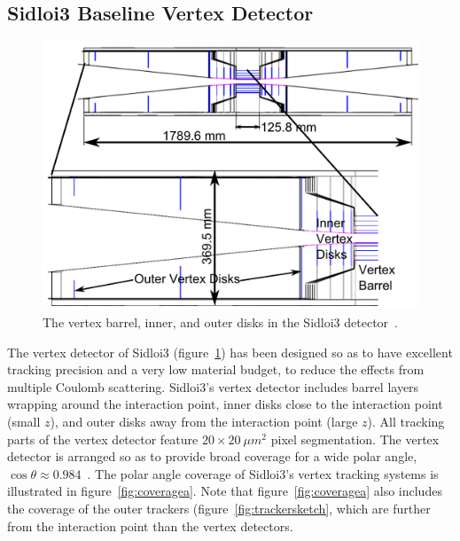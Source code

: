 \subsection{Sidloi3 Baseline Vertex Detector}
\begin{figure}[t]
\centering
\includegraphics{vertexDetectorSketch1.png}
\caption{The vertex barrel, inner, and outer disks
in the Sidloi3 detector~\cite{Behnke:2013lya}.}
\label{fig:vertexsketch}
\end{figure}
The vertex detector of Sidloi3 (figure~\ref{fig:vertexsketch})
has been designed so as to have excellent tracking precision
and a very low material budget, to reduce the effects from multiple Coulomb scattering.
Sidloi3's vertex detector includes barrel layers wrapping
around the interaction point,
inner disks close to the interaction point (small $z$),
and outer disks away from the interaction point (large $z$).
All tracking parts of the vertex detector feature $20 \times 20~\mu m^{2}$ pixel segmentation.
The vertex detector is arranged so as to provide 
broad coverage for a wide polar angle, $\cos{\theta} \approx 0.984$~\cite{Behnke:2013lya}.
The polar angle coverage of Sidloi3's vertex tracking systems
 is illustrated in figure~\ref{fig:coveragea}.
Note that figure~\ref{fig:coveragea} also includes
the coverage of the outer trackers (figure~\ref{fig:trackersketch}, which are further
from the interaction point than the vertex detectors.

